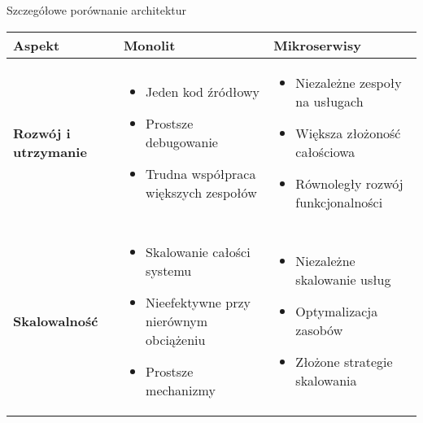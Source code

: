\documentclass[aspectratio=169,xcolor=table]{beamer}
\begin{document}
\begin{frame}{Szczegółowe porównanie architektur}
  \begin{table}
    \footnotesize
    \begin{tabular}{>{\raggedright\arraybackslash}p{2.8cm}|>{\raggedright\arraybackslash}p{3.8cm}|>{\raggedright\arraybackslash}p{3.8cm}}
      \toprule
      \textbf{Aspekt} & \textbf{Monolit} & \textbf{Mikroserwisy} \\
      \midrule
      \textbf{Rozwój i utrzymanie} & \begin{itemize}[leftmargin=*]
        \item Jeden kod źródłowy
        \item Prostsze debugowanie
        \item Trudna współpraca większych zespołów
      \end{itemize} & \begin{itemize}[leftmargin=*]
        \item Niezależne zespoły na usługach
        \item Większa złożoność całościowa
        \item Równoległy rozwój funkcjonalności
      \end{itemize} \\
      \midrule
      \textbf{Skalowalność} & \begin{itemize}[leftmargin=*]
        \item Skalowanie całości systemu
        \item Nieefektywne przy nierównym obciążeniu
        \item Prostsze mechanizmy
      \end{itemize} & \begin{itemize}[leftmargin=*]
        \item Niezależne skalowanie usług
        \item Optymalizacja zasobów
        \item Złożone strategie skalowania
      \end{itemize} \\
      \bottomrule
    \end{tabular}
  \end{table}
\end{frame}
\end{document}

